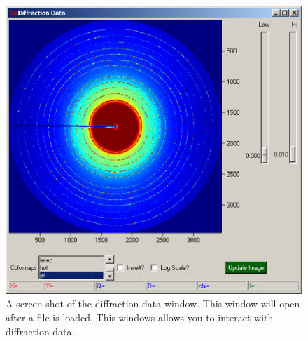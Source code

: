 \begin{figure}
    \centering
    \includegraphics[scale=.75]{figures/diffraction_data_window.eps}
    \caption{A screen shot of the diffraction data window. This 
    window will open after a file is 
    loaded. This windows allows you to interact with diffraction 
    data.} 
    \label{diffraction_data_window}
\end{figure}

